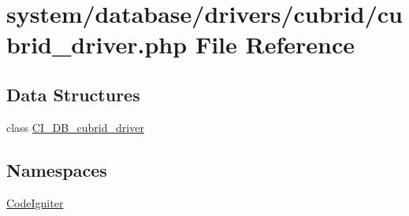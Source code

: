 \hypertarget{cubrid__driver_8php}{}\section{system/database/drivers/cubrid/cubrid\+\_\+driver.php File Reference}
\label{cubrid__driver_8php}
\subsection*{Data Structures}
\begin{DoxyCompactItemize}
\item 
class \mbox{\hyperlink{class_c_i___d_b__cubrid__driver}{C\+I\+\_\+\+D\+B\+\_\+cubrid\+\_\+driver}}
\end{DoxyCompactItemize}
\subsection*{Namespaces}
\begin{DoxyCompactItemize}
\item 
 \mbox{\hyperlink{namespace_code_igniter}{Code\+Igniter}}
\end{DoxyCompactItemize}
